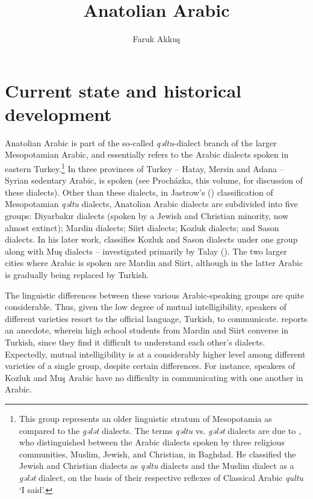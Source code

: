 \documentclass[output=paper]{langsci/langscibook}
\title{Anatolian Arabic}
\author{Faruk Akkuş\affiliation{University of Pennsylvania}}
\begin{document}
\maketitle

\section{Current state and historical development} 
     
Anatolian Arabic is part of the so-called \textit{qəltu}-dialect branch of the larger Mesopotamian Arabic, and essentially refers to the Arabic dialects spoken in eastern Turkey.\footnote{This group represents an older linguistic stratum of Mesopotamia as compared to the \textit{gələt} dialects. The terms \textit{qəltu} vs. \textit{gələt} dialects are due to \cite{Blanc1964}, who distinguished between the Arabic dialects spoken by three religious communities,
Muslim, Jewish, and Christian, in Baghdad. He classified the Jewish and
Christian dialects as \textit{qəltu} dialects and the Muslim dialect as a \textit{gələt} dialect, on the basis of their respective reflexes of Classical Arabic \textit{qultu} `I said'.} In three provinces of Turkey -- Hatay, Mersin and Adana -- Syrian sedentary Arabic, is spoken (see Proch\'{a}zka, this volume, for discussion of these dialects). Other than these dialects, in Jastrow's (\citeyear{Jastrow1978}) classification of Mesopotamian \textit{qəltu} dialects, Anatolian Arabic dialects are subdivided into five groups:
Diyarbak{\i}r dialects (spoken by a Jewish and Christian minority, now almost extinct); Mardin dialects; Siirt dialects; Kozluk dialects; and Sason dialects.
In his later work, \citet{Jastrow2011anatolian} classifies Kozluk and Sason dialects under one group along with Mu\c{s} dialects -- investigated primarily by Talay (\citeyear{Talay2001,Talay2002}). The two larger cities where Arabic is spoken are Mardin and Siirt, although in the latter Arabic is gradually being replaced by Turkish. 

The linguistic differences between these various Arabic-speaking groups are quite considerable. Thus, given the low degree of mutual intelligibility, speakers of different varieties resort to the official language, Turkish, to communicate. \citet{Jastrow2006} reports an anecdote, wherein high school students from Mardin and Siirt converse in Turkish, since they find it difficult to understand each other's dialects. Expectedly, mutual intelligibility is at a considerably higher level among different varieties of a single group, despite certain differences. For instance,  speakers of Kozluk and Mu\c{s} Arabic have no difficulty in communicating with one another in Arabic. 
\end{document}
